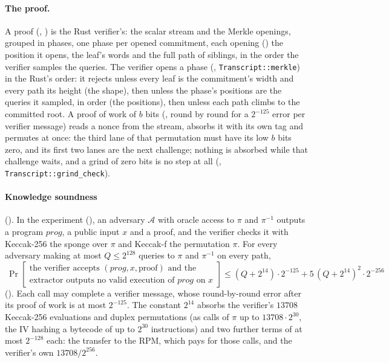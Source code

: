 \documentclass[11pt]{article}
\begin{document}
\paragraph{The proof.} A proof (, ) is the Rust
verifier's: the scalar stream and the Merkle openings, grouped in phases, one phase per opened
commitment, each opening () the position it opens, the leaf's words and the full path
of siblings, in the order the verifier samples the queries. The verifier opens a phase
(, \texttt{Transcript::merkle}) in the Rust's order: it rejects unless every leaf is
the commitment's width and every path its height (the shape), then unless the phase's positions are
the queries it sampled, in order (the positions), then unless each path climbs to the committed
root. A proof of work of $b$ bits (, round by round for a $2^{-125}$ error per
verifier message) reads a nonce from the stream, absorbs it with its own tag and permutes at once:
the third lane of that permutation must have its low $b$ bits zero, and its first two lanes are the
next challenge; nothing is absorbed while that challenge waits, and a grind of zero bits is no step
at all (, \texttt{Transcript::grind\_check}).



\paragraph{Knowledge soundness} (). In the experiment
(), an adversary $\mathcal{A}$ with oracle access to $\pi$ and
$\pi^{-1}$ outputs a program $\mathit{prog}$, a public input $x$ and a proof, and the verifier
checks it with Keccak-256 the sponge over $\pi$ and Keccak-f the permutation $\pi$. For every
adversary making at most $Q \le 2^{128}$ queries to $\pi$ and $\pi^{-1}$ on every path,
\[
\boxed{\ \Pr\left[\begin{array}{l}\text{the verifier accepts } (\mathit{prog},x,\text{proof}) \text{ and the}\\
\text{extractor outputs no valid execution of } \mathit{prog} \text{ on } x\end{array}\right]
\le (Q+2^{14})\cdot 2^{-125} + 5\,(Q+2^{14})^2\cdot 2^{-256}\ }
\]
(). Each call may complete a verifier message, whose
round-by-round error after its proof of work is at most $2^{-125}$. The constant $2^{14}$ absorbs
the verifier's $13708$ Keccak-256 evaluations and duplex permutations (as calls of $\pi$ up to
$13708\cdot 2^{30}$, the IV hashing a bytecode of up to $2^{30}$ instructions) and two further terms
of at most $2^{-128}$ each: the transfer to the RPM, which pays for those calls, and the verifier's own
$13708/2^{256}$.
\end{document}
